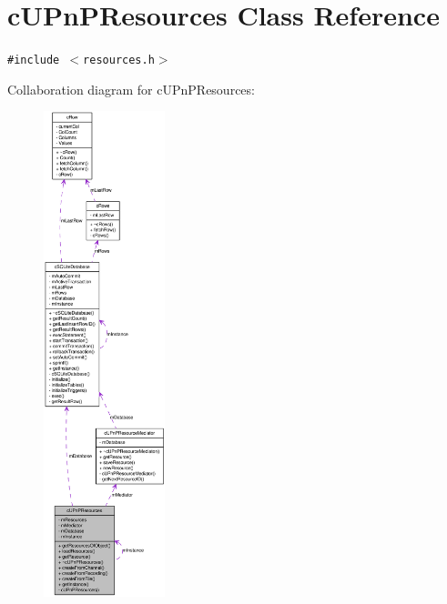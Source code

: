 \hypertarget{classcUPnPResources}{
\section{cUPnPResources Class Reference}
\label{classcUPnPResources}
}
{\tt \#include $<$resources.h$>$}

Collaboration diagram for cUPnPResources:\nopagebreak
\begin{figure}[H]
\begin{center}
\leavevmode
\includegraphics[height=400pt]{classcUPnPResources__coll__graph}
\end{center}
\end{figure}
